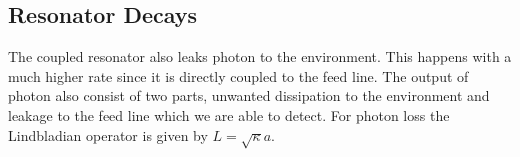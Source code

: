 



\subsection{Resonator Decays}\label{sec:resonator_decays}
The coupled resonator also leaks photon to the environment. This happens with a much higher rate since it is directly coupled to the feed line. The output of photon also consist of two parts, unwanted dissipation to the environment and leakage to the feed line which we are able to detect. For photon loss the Lindbladian operator is given by $L = \sqrt{\kappa}a$.

